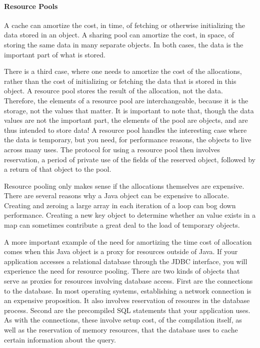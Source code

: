 \paragraph{Resource Pools}
\label{sec:resource-pools}

A cache can amortize the cost, in time, of fetching or otherwise initializing the
data stored in an object. A sharing pool can amortize the cost, in space, of
storing the same data in many separate objects. In both cases, the data is the
important part of what is stored.

 There is a third case,
where one needs to amortize the cost of the allocations, rather than the cost of
initializing or fetching the data that is stored in this object. A resource pool
stores the result of the allocation, not the data. Therefore, the elements of a
resource pool are interchangeable, because it is the storage, not the values that
matter. It is important to note that, though the data values are not the
important part, the elements of the pool are objects, and are thus intended to
store data! A resource pool handles the interesting case where the data is
temporary, but you need, for performance reasons, the objects to live across many
uses. The protocol for using a resource pool then involves reservation, a period
of private use of the fields of the reserved object, followed by a return of that
object to the pool.

Resource pooling only makes sense if the allocations themselves are expensive.
There are several reasons why a Java object can be expensive to allocate.
Creating and zeroing a large array in each iteration of a
loop can bog down performance. Creating a new key object to determine whether an
value exists in a map can sometimes contribute a great deal to the load of
temporary objects.

A more important example of the need for amortizing the time cost of allocation
comes when this Java object is a proxy for resources outside of Java. If your
application accesses a relational database through the JDBC
interface, you will experience the need for resource pooling. There are two kinds
of objects that serve as proxies for resources involving database access. First
are the connections to the database. In most operating systems, establishing a
network connection is an expensive proposition. It also involves reservation of
resoures in the database process. Second are the precompiled SQL statements that
your application uses. As with the connections, these involve setup cost, of the
compilation itself, as well as the reservation of memory resources, that the
database uses to cache certain information about the query.





